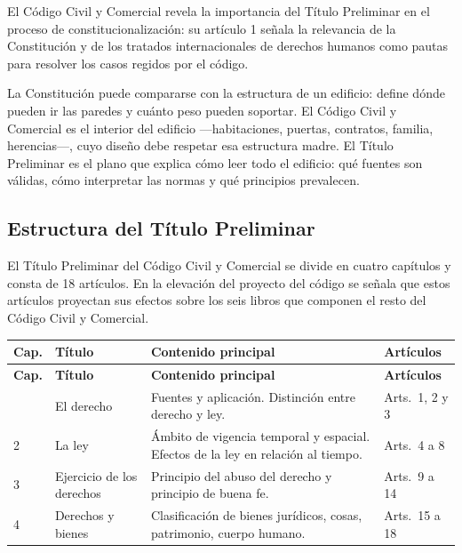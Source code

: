 \documentclass[12pt,oneside]{book}
\begin{document}
El Código Civil y Comercial revela la importancia del Título Preliminar en el proceso de constitucionalización: su artículo 1 señala la relevancia de la Constitución y de los tratados internacionales de derechos humanos como pautas para resolver los casos regidos por el código.

\begin{note}
La Constitución puede compararse con la estructura de un edificio: define dónde pueden ir las paredes y cuánto peso pueden soportar. El Código Civil y Comercial es el interior del edificio —habitaciones, puertas, contratos, familia, herencias—, cuyo diseño debe respetar esa estructura madre. El Título Preliminar es el plano que explica cómo leer todo el edificio: qué fuentes son válidas, cómo interpretar las normas y qué principios prevalecen.
\end{note}

\subsection{Estructura del Título Preliminar}

El Título Preliminar del Código Civil y Comercial se divide en cuatro capítulos y consta de 18 artículos. En la elevación del proyecto del código se señala que estos artículos proyectan sus efectos sobre los seis libros que componen el resto del Código Civil y Comercial.

\begin{longtable}{|p{}|p{}|p{}|p{}|}
\hline
\textbf{Cap.} & \textbf{Título} & \textbf{Contenido principal} & \textbf{Artículos} \\
\hline
\endfirsthead
\hline
\textbf{Cap.} & \textbf{Título} & \textbf{Contenido principal} & \textbf{Artículos} \\
\hline
\endhead
\hline
\endfoot
\hline
\endlastfoot
1 & El derecho & Fuentes y aplicación. Distinción entre derecho y ley. & Arts.\ 1, 2 y 3 \\
\hline
2 & La ley & Ámbito de vigencia temporal y espacial. Efectos de la ley en relación al tiempo. & Arts.\ 4 a 8 \\
\hline
3 & Ejercicio de los derechos & Principio del abuso del derecho y principio de buena fe. & Arts.\ 9 a 14 \\
\hline
4 & Derechos y bienes & Clasificación de bienes jurídicos, cosas, patrimonio, cuerpo humano. & Arts.\ 15 a 18 \\
\hline
\end{longtable}
\end{document}
